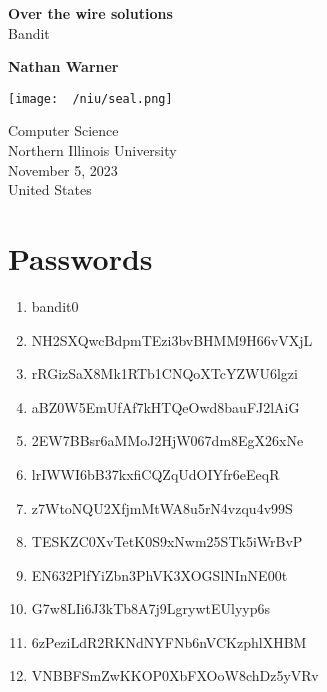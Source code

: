 \documentclass{report}
\title{\Huge{}}
\author{\huge{Nathan Warner}}
\date{\huge{}}
\begin{document}
        \begin{titlepage}
       \begin{center}
           \vspace*{1cm}
    
           \textbf{Over the wire solutions} \\
           Bandit
    
           \vspace{0.5cm}
            
                
           \vspace{1.5cm}
    
           \textbf{Nathan Warner}
    
           \vfill
                
                
           \vspace{0.8cm}
         
           \texttt{[image: ~/niu/seal.png]}
                
           Computer Science \\
           Northern Illinois University\\
           November 5, 2023 \\
           United States\\
           
                
       \end{center}
    \end{titlepage}
    \tableofcontents
    \pagebreak 
    \section*{Passwords}
    \begin{enumerate}[start=0]
        \item bandit0
        \item NH2SXQwcBdpmTEzi3bvBHMM9H66vVXjL
        \item rRGizSaX8Mk1RTb1CNQoXTcYZWU6lgzi
        \item aBZ0W5EmUfAf7kHTQeOwd8bauFJ2lAiG
        \item 2EW7BBsr6aMMoJ2HjW067dm8EgX26xNe
        \item lrIWWI6bB37kxfiCQZqUdOIYfr6eEeqR
        \item z7WtoNQU2XfjmMtWA8u5rN4vzqu4v99S
        \item TESKZC0XvTetK0S9xNwm25STk5iWrBvP
        \item EN632PlfYiZbn3PhVK3XOGSlNInNE00t
        \item G7w8LIi6J3kTb8A7j9LgrywtEUlyyp6s
        \item 6zPeziLdR2RKNdNYFNb6nVCKzphlXHBM
        \item VNBBFSmZwKKOP0XbFXOoW8chDz5yVRv
    \end{enumerate}
\end{document}
